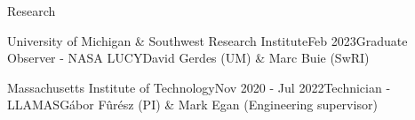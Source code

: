 \documentclass{resume} %
\begin{document}
\begin{rSection}{Research}
\begin{rSubsection}{University of Michigan \& Southwest Research Institute}{Feb 2023}{Graduate Observer - NASA LUCY}{David Gerdes (UM) \& Marc Buie (SwRI)}
\end{rSubsection}

\begin{rSubsection}{Massachusetts Institute of Technology}{Nov 2020 - Jul 2022}{Technician - LLAMAS}{G\'abor F\^ur\'esz (PI) \& Mark Egan (Engineering supervisor)}
\end{rSubsection}


\end{rSection}
\end{document}

